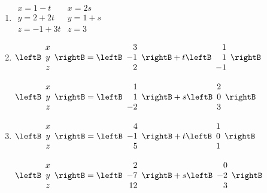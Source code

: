 \begin{multicols}{2}
\begin{ex}
\begin{enumerate}[label={\alph*.}]
\item
$\begin{array}{ll}
	x = 1 - t & x = 2s \\
	y = 2 + 2t & y = 1 + s \\
	z = -1 + 3t & z = 3 
\end{array}$

\item 
$\leftB
\begin{array}{c}
x\\
y\\
z
\end{array}
\rightB
=
\leftB
\begin{array}{r}
3\\
-1\\
2
\end{array}
\rightB
+ t
\leftB
\begin{array}{r}
1\\
1\\
-1
\end{array}
\rightB$

$\leftB
\begin{array}{c}
x\\
y\\
z
\end{array}
\rightB
=
\leftB
\begin{array}{r}
1\\
1\\
-2
\end{array}
\rightB
+ s
\leftB
\begin{array}{r}
2\\
0\\
3
\end{array}
\rightB$

\item 
$\leftB
\begin{array}{c}
x\\
y\\
z
\end{array}
\rightB
=
\leftB
\begin{array}{r}
4\\
-1\\
5
\end{array}
\rightB
+ t
\leftB
\begin{array}{r}
1\\
0\\
1
\end{array}
\rightB$

$\leftB
\begin{array}{c}
x\\
y\\
z
\end{array}
\rightB
=
\leftB
\begin{array}{r}
2\\
-7\\
12
\end{array}
\rightB
+ s
\leftB
\begin{array}{r}
0\\
-2\\
3
\end{array}
\rightB$


\end{enumerate}
\end{ex}
\end{multicols}
